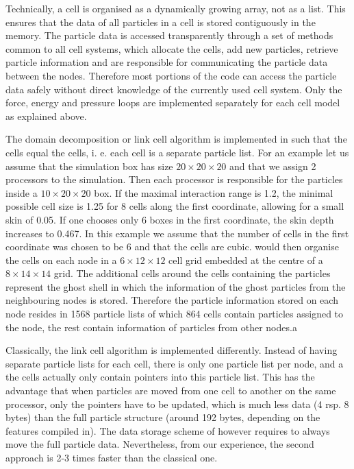Technically, a cell is organised as a dynamically growing array, not
as a list. This ensures that the data of all particles in a cell is
stored contiguously in the memory. The particle data is accessed
transparently through a set of methods common to all cell systems,
which allocate the cells, add new particles, retrieve particle
information and are responsible for communicating the particle data
between the nodes. Therefore most portions of the code can access the
particle data safely without direct knowledge of the currently used
cell system. Only the force, energy and pressure loops are implemented
separately for each cell model as explained above.

The domain decomposition or link cell algorithm is implemented in
\es{} such that the cells equal the \es{} cells, i. e. each cell is a
separate particle list. For an example let us assume that the
simulation box has size $20\times 20\times 20$ and that we assign 2
processors to the simulation. Then each processor is responsible for
the particles inside a $10\times 20\times 20$ box. If the maximal
interaction range is 1.2, the minimal possible cell size is 1.25 for 8
cells along the first coordinate, allowing for a small skin of 0.05.
If one chooses only 6 boxes in the first coordinate, the skin depth
increases to 0.467. In this example we assume that the number of cells
in the first coordinate was chosen to be 6 and that the cells are
cubic. \es{} would then organise the cells on each node in a $6\times
12\times 12$ cell grid embedded at the centre of a $8\times 14 \times
14$ grid. The additional cells around the cells containing the
particles represent the ghost shell in which the information of the
ghost particles from the neighbouring nodes is stored. Therefore the
particle information stored on each node resides in 1568 particle
lists of which 864 cells contain particles assigned to the node, the
rest contain information of particles from other nodes.a

Classically, the link cell algorithm is implemented differently.
Instead of having separate particle lists for each cell, there is only
one particle list per node, and a the cells actually only contain
pointers into this particle list. This has the advantage that when
particles are moved from one cell to another on the same processor,
only the pointers have to be updated, which is much less data (4 rsp.
8 bytes) than the full particle structure (around 192 bytes, depending
on the features compiled in). The data storage scheme of \es{} however
requires to always move the full particle data. Nevertheless, from our
experience, the second approach is 2-3 times faster than the classical
one.

